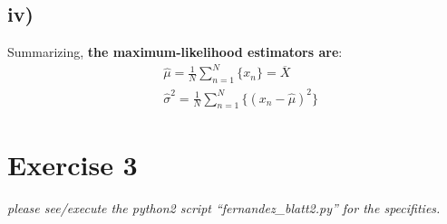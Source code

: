 \documentclass[11pt]{scrartcl} %
\begin{document}
         \subsection*{iv)}
         Summarizing, \textbf{the maximum-likelihood estimators are}:
         \begin{equation*}
           \begin{split}
             &\hat\mu = \frac{1}{N}\sum_{n=1}^{N}\{x_n\} = \overline{X}\\
             &\hat\sigma^2 = \frac{1}{N}\sum_{n=1}^{N}\{(x_n-\hat\mu)^2\}
             \end{split}
         \end{equation*}







        \vspace{5mm}
	\section*{Exercise 3}
                 {\it please see/execute the python2 script ``fernandez\_blatt2.py'' for the specifities. }
\end{document}
